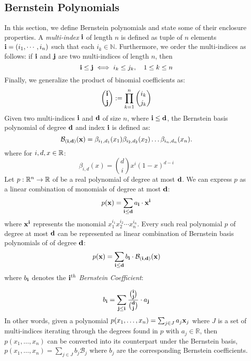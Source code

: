 \subsection{Bernstein Polynomials}
\label{sec:bernstein}
In this section, we define Bernstein polynomials and state some of their enclosure properties. A \emph{multi-index} ${\bf i}$ of length $n$ is defined as tuple of $n$ elements ${\bf i} = (i_1,\cdots, i_n)$ such that each $i_k \in \mathbb{N}$. Furthermore, we order the multi-indices as follows: if ${\bf i}$ and ${\bf j}$ are two multi-indices of length $n$, then
\[
  {\bf i} \leq {\bf j} \iff i_k \leq j_k, \quad 1 \leq  k \leq n
\]
Finally, we generalize the product of binomial coefficients as:
\[
  \binom{{\bf i}}{{\bf j}} := \prod_{k=1}^n \binom{i_k}{j_k}
\]
%
Given two multi-indices ${\bf i}$ and ${\bf d}$ of size $n$, where ${\bf i} \leq {\bf d}$, the Bernstein basis polynomial of degree ${\bf d}$ and index ${\bf i}$ is defined as:
\begin{equation}
\label{eq:bernstein_basis_poly}
\mathcal{B}_{({\bf i},{\bf d})}({\bf x}) = \beta_{i_1,d_1}(x_1) \beta_{i_2,d_2}(x_2)\ldots \beta_{i_n,d_n}(x_n).
\end{equation}
%
where for $i,d,x \in {\mathbb{R}}$:
%
\begin{equation}
\beta_{i,d}(x) = \binom{d}{i}x^{i}(1-x)^{d - i}
\end{equation}
%
Let $p: {\mathbb{R}}^n \rightarrow {\mathbb{R}}$ of be a real polynomial of degree at most ${\bf d}$. We can express $p$ as a linear combination of monomials of degree at most ${\bf d}$:
\[
p({\bf x}) = \sum_{{\bf i} \leq {\bf d}} a_{\bf i} \cdot {\bf x}^{\bf i}
\]
where ${\bf x}^{\bf i}$ represents the monomial $x_1^{i_1}x_2^{i_2}\cdots x_n^{i_n}$. Every such real polynomial $p$ of degree at most ${\bf d}$ can be represented as linear combination of Bernstein basis polynomials of of degree ${\bf d}$:
%
\begin{equation}
  p({\bf x}) = \sum_{{\bf i} \leq {\bf d}} b_{{\bf i}} \cdot \mathcal{B}_{({\bf i},{\bf d})}({\bf x})
\end{equation}
where $b_{\bf i}$ denotes the \emph{${\bf i}^{th}$ Bernstein Coefficient}:

\begin{equation}
b_{{\bf i}} = \sum_{{\bf j} \leq {\bf i}} \frac{\binom{{\bf i}}{{\bf j}}}{\binom{{\bf d}}{{\bf j}}}\cdot a_{{\bf j}}
\end{equation}
%
\noindent In other words, given a polynomial $p(x_1,\ldots,x_n) = \sum_{j \in J} a_j {\bf x}_{j}$ where $J$ is a set of multi-indices iterating through the degrees found in $p$ with $a_j \in \mathbb{R}$, then $p(x_1,\ldots,x_n)$ can be converted into its counterpart under the Bernstein basis, $p(x_1,\ldots,x_n) = \sum_{j \in J} b_j \mathcal{B}_j $ where $b_j$ are the corresponding Bernstein coefficients.
%

